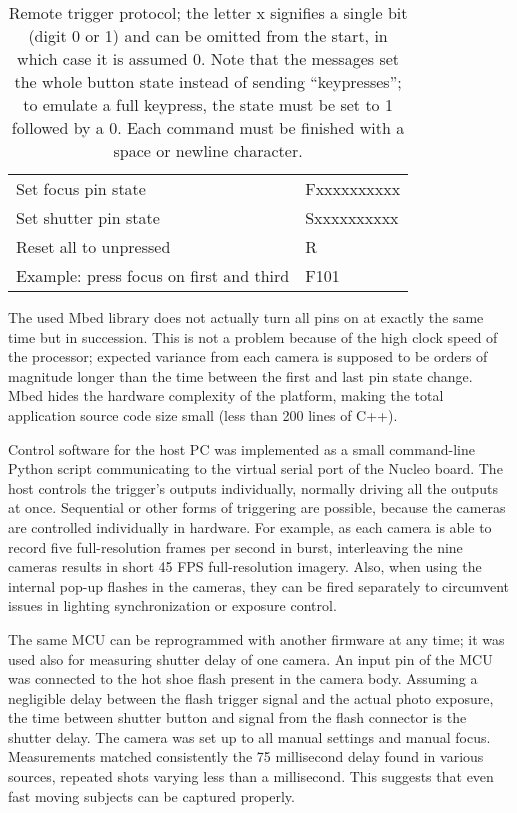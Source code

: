 \begin{table}[h]
	\centering
	\begin{tabular}{l l}
		Set focus pin state & Fxxxxxxxxxx\\
		Set shutter pin state & Sxxxxxxxxxx\\
		Reset all to unpressed & R\\
		Example: press focus on first and third & F101\\
	\end{tabular}
	\caption{
		Remote trigger protocol; the letter x signifies a single bit (digit 0 or 1) and can be omitted from the start, in which case it is assumed 0.
		Note that the messages set the whole button state instead of sending ``keypresses'';
		to emulate a full keypress, the state must be set to 1 followed by a 0.
		Each command must be finished with a space or newline character.
	}
	\label{tab:triggerprotocol}
\end{table}

The used Mbed library does not actually turn all pins on at exactly the same time but in succession.
This is not a problem because of the high clock speed of the processor; expected variance from each camera is supposed to be orders of magnitude longer than the time between the first and last pin state change. %
Mbed hides the hardware complexity of the platform, making the total application source code size small (less than 200 lines of C++).

Control software for the host PC was implemented as a small command-line Python script communicating to the virtual serial port of the Nucleo board.
The host controls the trigger's outputs individually, normally driving all the outputs at once.
Sequential or other forms of triggering are possible, because the cameras are controlled individually in hardware.
For example, as each camera is able to record five full-resolution frames per second in burst, interleaving the nine cameras results in short 45 FPS full-resolution imagery.
Also, when using the internal pop-up flashes in the cameras, they can be fired separately to circumvent issues in lighting synchronization or exposure control.

The same MCU can be reprogrammed with another firmware at any time; it was used also for measuring shutter delay of one camera.
An input pin of the MCU was connected to the hot shoe flash present in the camera body.
Assuming a negligible delay between the flash trigger signal and the actual photo exposure, the time between shutter button and signal from the flash connector is the shutter delay.
The camera was set up to all manual settings and manual focus.
Measurements matched consistently the 75 millisecond delay found in various sources, repeated shots varying less than a millisecond.
This suggests that even fast moving subjects can be captured properly.

